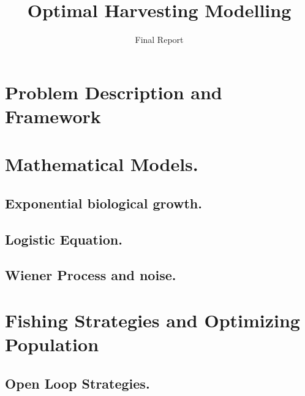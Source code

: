 \documentclass[twoside,colorback,accentcolor=tud4c,11pt]{tudreport}
\title{Optimal Harvesting Modelling}
\subtitle{Final Report}
\begin{document}
\maketitle
\begin{abstract}
	
\end{abstract}  

\tableofcontents
%
\chapter{Problem Description and Framework}\label{chap:Problem Framework}
\graphicspath{{ProblemFramework/}}

\chapter{Mathematical Models.} \label{chap: Deterministic Model}
	
	\section{Exponential biological growth.}
		\graphicspath{{Model/ExponentialGrowth/}}
		
	\section{Logistic Equation.}
		\graphicspath{{Model/LogisticEquation/}}
		
	\section{Wiener Process and noise.} 
		\graphicspath{{Model/WienerProcess/}}
		
\chapter{Fishing Strategies and Optimizing Population} \label{chap: Fishing Strategies}
	
	\section{Open Loop Strategies.}
	\graphicspath{{FishingStrategies/OpenLoop/}{FishingStrategies/OpenLoop/ConstantHarvest/}{FishingStrategies/OpenLoop/TimeHarvesting/}{FishingStrategies/OpenLoop/OptimalControl/}}
	
\end{document}
